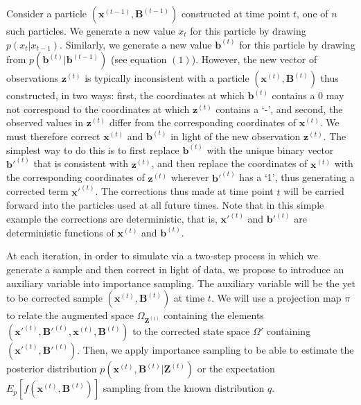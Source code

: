 \documentclass[11pt,a4paper]{article}
\renewcommand{\vec}[1]{\mathbf{#1}}
\begin{document}
Consider a particle $(\vec{x}^{(t-1)},\vec{B}^{(t-1)})$ constructed at time point $t$, one of $n$ such particles. We generate a new value $x_t$ for this particle by drawing $p(x_t | x_{t-1})$. Similarly, we generate a new value $\vec{b}^{(t)}$ for this particle by drawing from $p(\vec{b}^{(t)} | \vec{b}^{(t-1)})$ (see equation $(1)$). However, the new vector of observations $\vec{z}^{(t)}$ is typically inconsistent with a particle $(\vec{x}^{(t)}, \vec{B}^{(t)})$ thus constructed, in two ways: first, the coordinates at which $\vec{b}^{(t)}$ contains a 0 may not correspond to the coordinates at which $\vec{z}^{(t)}$ contains a `-', and second, the observed values in $\vec{z}^{(t)}$ differ from the corresponding coordinates of $\vec{x}^{(t)}$. We must therefore correct $\vec{x}^{(t)}$ and $\vec{b}^{(t)}$ in light of the new observation $\vec{z}^{(t)}$. The simplest way to do this is to first replace $\vec{b}^{(t)}$ with the unique binary vector $\vec{b'}^{(t)}$ that is consistent with $\vec{z}^{(t)}$, and then replace the coordinates of $\vec{x}^{(t)}$ with the corresponding coordinates of $\vec{z}^{(t)}$ wherever $\vec{b'}^{(t)}$ has a `1', thus generating a corrected term $\vec{x'}^{(t)}$. The corrections thus made at time point $t$ will be carried forward into the particles used at all future times. Note that in this simple example the corrections are deterministic, that is, $\vec{x'}^{(t)}$ and $\vec{b'}^{(t)}$ are deterministic functions of $\vec{x}^{(t)}$ and $\vec{b}^{(t)}$. 

At each iteration, in order to simulate via a two-step process in which we generate a sample and then correct in light of data, we propose to introduce an auxiliary variable into importance sampling. The auxiliary variable will be the yet to be corrected sample $(\vec{x}^{(t)}, \vec{B}^{(t)})$ at time $t$. We will use a projection map $\pi$ to relate the augmented space $\Omega_{\vec{Z}^{(t)}}$ containing the elements $(\vec{x'}^{(t)}, \vec{B'}^{(t)}, \vec{x}^{(t)}, \vec{B}^{(t)})$ to the corrected state space $\Omega'$ containing $(\vec{x'}^{(t)}, \vec{B'}^{(t)})$. Then, we apply importance sampling to be able to estimate the posterior distribution $p(\vec{x}^{(t)}, \vec{B}^{(t)} | \vec{Z}^{(t)})$ or the expectation $E_{p}[f(\vec{x}^{(t)},\vec{B}^{(t)})]$  sampling from the known distribution $q$.
\end{document}
